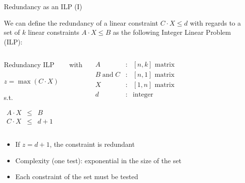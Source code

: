 \documentclass{beamer}
\begin{document}
    \begin{frame}{Redundancy as an ILP (I)}

    We can define the redundancy of a linear constraint $C \cdot X \leqslant d$ with regards to a set of $k$ linear constraints $A \cdot X \leqslant B$ as the following Integer Linear Problem (ILP):

    \begin{columns}[c]

        \begin{block}{Redundancy ILP}

        \begin{center}
        $z = \max \left( C \cdot X \right)$

        s.t.

        $
        \begin{array}{rcc}
          A \cdot X &\leq & B \\
          C \cdot X &\leq & d + 1
        \end{array}
        $
        \end{center}

        \end{block}



        \begin{center}with\end{center}
        \[
          \begin{array}{ccc}
            A & : & [n,k] \text{ matrix}\\
            B \; \text{and} \; C & : & [n,1] \text{ matrix}\\
            X & : & [1,n] \text{ matrix}\\
            d & : & \text{integer}
          \end{array}
        \]
    \end{columns}
        \begin{itemize}
            \item If $z = d + 1$, the constraint is redundant
            \item Complexity (one test): exponential in the size of the set
            \item Each constraint of the set must be tested
        \end{itemize}

    \end{frame}
\end{document}
